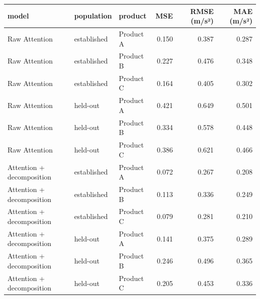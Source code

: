 \begin{tabular}{lllrrr}
\toprule
model & population & product & MSE & RMSE (m/s²) & MAE (m/s²) \\
\midrule
Raw Attention & established & Product A & 0.150 & 0.387 & 0.287 \\
Raw Attention & established & Product B & 0.227 & 0.476 & 0.348 \\
Raw Attention & established & Product C & 0.164 & 0.405 & 0.302 \\
Raw Attention & held-out & Product A & 0.421 & 0.649 & 0.501 \\
Raw Attention & held-out & Product B & 0.334 & 0.578 & 0.448 \\
Raw Attention & held-out & Product C & 0.386 & 0.621 & 0.466 \\
Attention + decomposition & established & Product A & 0.072 & 0.267 & 0.208 \\
Attention + decomposition & established & Product B & 0.113 & 0.336 & 0.249 \\
Attention + decomposition & established & Product C & 0.079 & 0.281 & 0.210 \\
Attention + decomposition & held-out & Product A & 0.141 & 0.375 & 0.289 \\
Attention + decomposition & held-out & Product B & 0.246 & 0.496 & 0.365 \\
Attention + decomposition & held-out & Product C & 0.205 & 0.453 & 0.336 \\
\bottomrule
\end{tabular}
